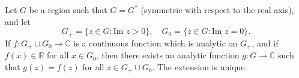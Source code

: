Let $G$ be a region such that $G = G^*$ (symmetric with respect to the real axis), and let
$$G_+ = \{z \in G : \text{Im } z > 0\}, \quad G_0 = \{z \in G : \text{Im } z = 0\}.$$
If $f: G_+ \cup G_0 \to \mathbb{C}$ is a continuous function which is analytic on $G_+$, and if $f(x) \in \mathbb{R}$ for all $x \in G_0$, then there exists an analytic function $g: G \to \mathbb{C}$ such that $g(z) = f(z)$ for all $z \in G_+ \cup G_0$. The extension is unique.
